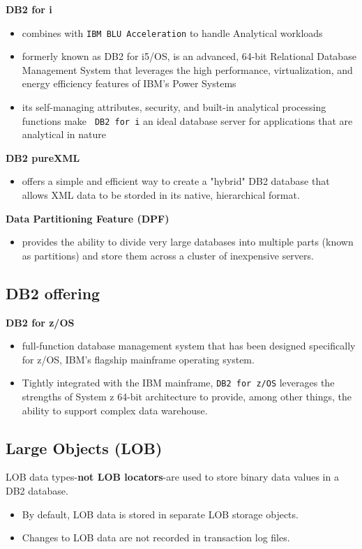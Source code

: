 \documentclass{article}
\begin{document}
\textbf{DB2 for i}
\begin{itemize}
\item combines with \texttt{IBM BLU Acceleration} to handle Analytical workloads
\item formerly known as DB2 for i5/OS, is an advanced, 64-bit Relational Database Management System
that leverages the high performance, virtualization, and energy efficiency features of IBM's Power Systems
\item its self-managing attributes, security, and built-in analytical processing functions make \texttt{
DB2 for i} an ideal database server for applications that are analytical in nature
\end{itemize}

\textbf{DB2 pureXML}
\begin{itemize}
\item offers a simple and efficient way to create a "hybrid" DB2 database that allows XML data
to be storded in its native, hierarchical format.
\end{itemize}

\textbf{Data Partitioning Feature (DPF)}
\begin{itemize}
\item provides the ability to divide very large databases into multiple parts (known as partitions) and
store them across a cluster of inexpensive servers.
\end{itemize}

\subsection{DB2 offering}
\textbf{DB2 for z/OS}
\begin{itemize}
\item full-function database management system that has been designed specifically for z/OS, IBM's
flagship mainframe operating system.
\item Tightly integrated with the IBM mainframe, \texttt{DB2 for z/OS} leverages the strengths of System
z 64-bit architecture to provide, among other things, the ability to support complex data warehouse.
\end{itemize}


\subsection{Large Objects (LOB)}

LOB data types-\textbf{not LOB locators}-are used to store binary data values in a DB2 database.
\begin{itemize}
\item By default, LOB data is stored in separate LOB storage objects.
\item Changes to LOB data are not recorded in transaction log files.
\end{itemize}
\end{document}
